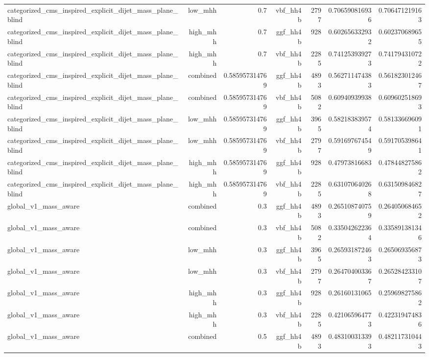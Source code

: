 \begin{table}[htbp]
{\begin{tabular}{lrrrrrr}
categorized\_cms\_inspired\_explicit\_dijet\_mass\_plane\_blind & low\_mhh & 0.7 & vbf\_hh4b & 2797 & 0.706590816936 & 0.706471219163 \\
categorized\_cms\_inspired\_explicit\_dijet\_mass\_plane\_blind & high\_mhh & 0.7 & ggf\_hh4b & 928 & 0.602656332932 & 0.602370689655 \\
categorized\_cms\_inspired\_explicit\_dijet\_mass\_plane\_blind & high\_mhh & 0.7 & vbf\_hh4b & 2285 & 0.741253939273 & 0.741794310722 \\
categorized\_cms\_inspired\_explicit\_dijet\_mass\_plane\_blind & combined & 0.585957314769 & ggf\_hh4b & 4893 & 0.562711474383 & 0.561823012467 \\
categorized\_cms\_inspired\_explicit\_dijet\_mass\_plane\_blind & combined & 0.585957314769 & vbf\_hh4b & 5082 & 0.60940939938 & 0.609602518693 \\
categorized\_cms\_inspired\_explicit\_dijet\_mass\_plane\_blind & low\_mhh & 0.585957314769 & ggf\_hh4b & 3965 & 0.582183839574 & 0.581336696091 \\
categorized\_cms\_inspired\_explicit\_dijet\_mass\_plane\_blind & low\_mhh & 0.585957314769 & vbf\_hh4b & 2797 & 0.591697674549 & 0.591705398641 \\
categorized\_cms\_inspired\_explicit\_dijet\_mass\_plane\_blind & high\_mhh & 0.585957314769 & ggf\_hh4b & 928 & 0.47973816683 & 0.478448275862 \\
categorized\_cms\_inspired\_explicit\_dijet\_mass\_plane\_blind & high\_mhh & 0.585957314769 & vbf\_hh4b & 2285 & 0.631070640268 & 0.631509846827 \\
global\_v1\_mass\_aware & combined & 0.3 & ggf\_hh4b & 4893 & 0.265108740759 & 0.264050684652 \\
global\_v1\_mass\_aware & combined & 0.3 & vbf\_hh4b & 5082 & 0.335042622364 & 0.335891381346 \\
global\_v1\_mass\_aware & low\_mhh & 0.3 & ggf\_hh4b & 3965 & 0.265931872463 & 0.265069356873 \\
global\_v1\_mass\_aware & low\_mhh & 0.3 & vbf\_hh4b & 2797 & 0.264704003367 & 0.265284233107 \\
global\_v1\_mass\_aware & high\_mhh & 0.3 & ggf\_hh4b & 928 & 0.26160131065 & 0.259698275862 \\
global\_v1\_mass\_aware & high\_mhh & 0.3 & vbf\_hh4b & 2285 & 0.421065964773 & 0.422319474836 \\
global\_v1\_mass\_aware & combined & 0.5 & ggf\_hh4b & 4893 & 0.483100313393 & 0.482117310443 \\

\end{tabular}}
\end{table}
